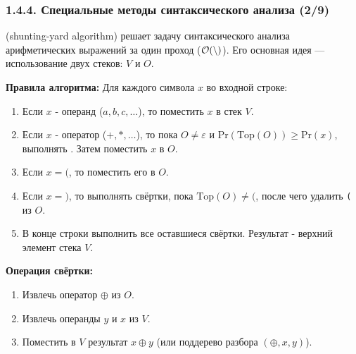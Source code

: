 \begin{frame}
\frametitle{1.4.4. Специальные методы синтаксического анализа (2/9)}
 (shunting-yard algorithm) решает задачу синтаксического анализа арифметических выражений за один проход ($\cal{O}(n)$). Его основная идея — использование двух стеков:  $V$ и  $O$. 

\textbf{Правила алгоритма:} 
Для каждого символа $x$ во входной строке: 
\begin{enumerate}
\item Если $x$ - операнд ($a, b, c, \dots$), то поместить $x$ в стек $V$.
\item Если $x$ - оператор ($+, *, \dots$), то пока
$O \neq \varepsilon$ и $\mathrm{Pr}(\mathrm{Top}(O)) \ge \mathrm{Pr}(x)$,
выполнять . Затем поместить $x$ в $O$.
\item Если $x = \texttt{(}$, то поместить его в $O$.
\item Если $x = \texttt{)}$, то выполнять свёртки, пока
$\mathrm{Top}(O) \neq \texttt{(}$, после чего удалить \texttt{(} из $O$.
\item В конце строки выполнить все оставшиеся свёртки.
Результат - верхний элемент стека $V$.
\end{enumerate}

\textbf{Операция свёртки:}
\begin{enumerate}
\item Извлечь оператор $\oplus$ из $O$.
\item Извлечь операнды $y$ и $x$ из $V$.
\item Поместить в $V$ результат $x \oplus y$
(или поддерево разбора $(\oplus, x, y)$).
\end{enumerate}
\end{frame}

